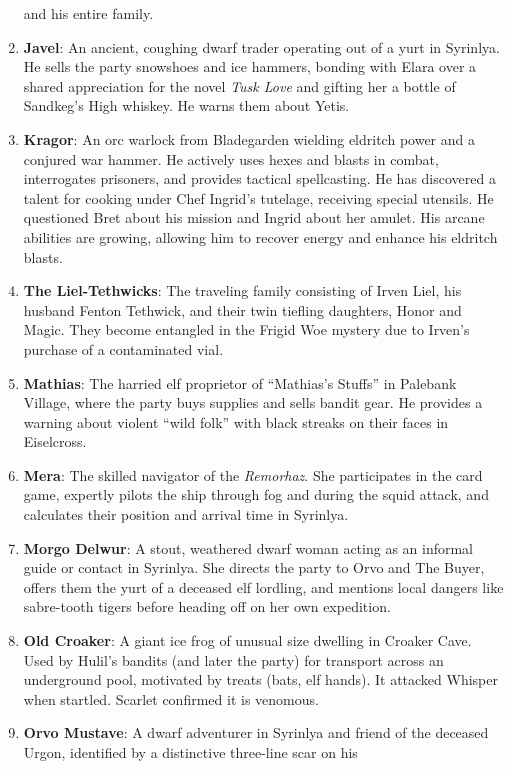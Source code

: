 \documentclass[
  letterpaper,12pt,twoside,twocolumn,openany,
  nodeprecatedcode,bg=full]{dndbook}
\begin{document}
\begin{enumerate}
  and his entire family.
\item
  \textbf{Javel}: An ancient, coughing dwarf trader operating out of a
  yurt in Syrinlya. He sells the party snowshoes and ice hammers,
  bonding with Elara over a shared appreciation for the novel \emph{Tusk
  Love} and gifting her a bottle of Sandkeg's High whiskey. He warns
  them about Yetis.
\item
  \textbf{Kragor}: An orc warlock from Bladegarden wielding eldritch
  power and a conjured war hammer. He actively uses hexes and blasts in
  combat, interrogates prisoners, and provides tactical spellcasting. He
  has discovered a talent for cooking under Chef Ingrid's tutelage,
  receiving special utensils. He questioned Bret about his mission and
  Ingrid about her amulet. His arcane abilities are growing, allowing
  him to recover energy and enhance his eldritch blasts.
\item
  \textbf{The Liel-Tethwicks}: The traveling family consisting of Irven
  Liel, his husband Fenton Tethwick, and their twin tiefling daughters,
  Honor and Magic. They become entangled in the Frigid Woe mystery due
  to Irven's purchase of a contaminated vial.
\item
  \textbf{Mathias}: The harried elf proprietor of ``Mathias's Stuffs''
  in Palebank Village, where the party buys supplies and sells bandit
  gear. He provides a warning about violent ``wild folk'' with black
  streaks on their faces in Eiselcross.
\item
  \textbf{Mera}: The skilled navigator of the \emph{Remorhaz}. She
  participates in the card game, expertly pilots the ship through fog
  and during the squid attack, and calculates their position and arrival
  time in Syrinlya.
\item
  \textbf{Morgo Delwur}: A stout, weathered dwarf woman acting as an
  informal guide or contact in Syrinlya. She directs the party to Orvo
  and The Buyer, offers them the yurt of a deceased elf lordling, and
  mentions local dangers like sabre-tooth tigers before heading off on
  her own expedition.
\item
  \textbf{Old Croaker}: A giant ice frog of unusual size dwelling in
  Croaker Cave. Used by Hulil's bandits (and later the party) for
  transport across an underground pool, motivated by treats (bats, elf
  hands). It attacked Whisper when startled. Scarlet confirmed it is
  venomous.
\item
  \textbf{Orvo Mustave}: A dwarf adventurer in Syrinlya and friend of
  the deceased Urgon, identified by a distinctive three-line scar on his

\end{enumerate}
\end{document}

